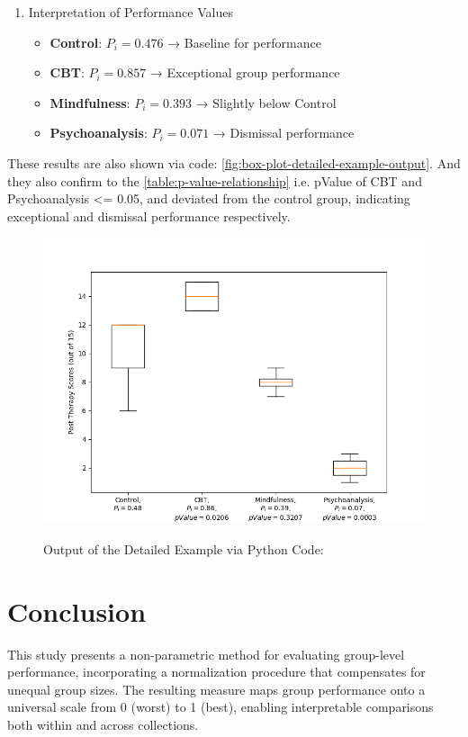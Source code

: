 \documentclass[a4paper,fleqn,review]{cas-sc}
\begin{document}
\begin{enumerate}[Step 1.]
	\item Interpretation of Performance Values
	\begin{itemize}
		\item \textbf{Control}: $P_i = 0.476$ → Baseline for performance
		\item \textbf{CBT}: $P_i = 0.857$ → Exceptional group performance
		\item \textbf{Mindfulness}: $P_i = 0.393$ → Slightly below Control
		\item \textbf{Psychoanalysis}: $P_i = 0.071$ → Dismissal performance
	\end{itemize}
\end{enumerate}
These results are also shown via code: \autoref{fig:box-plot-detailed-example-output}. And they also confirm to the \autoref{table:p-value-relationship} i.e. pValue of CBT and Psychoanalysis <= 0.05, and deviated from the control group, indicating exceptional and dismissal performance respectively.
\begin{figure}
	\caption{Output of the Detailed Example via Python Code:}
	\centering
	\includegraphics [scale=0.65]{output-detailed-example.png}
	\label{fig:box-plot-detailed-example-output}
\end{figure}
\section{Conclusion}
This study presents a non-parametric method for evaluating group-level performance, incorporating a normalization procedure that compensates for unequal group sizes. The resulting measure maps group performance onto a universal scale from 0 (worst) to 1 (best), enabling interpretable comparisons both within and across collections.

\pagebreak


\appendix
\end{document}
